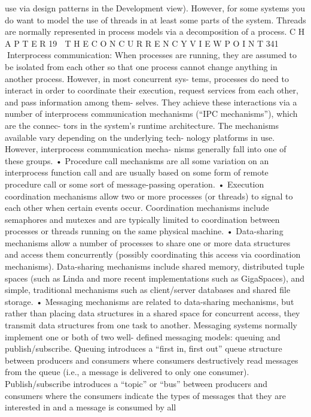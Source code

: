 use via design patterns in the Development view). However, for some
systems you do want to model the use of threads in at least some parts of
the system. Threads are normally represented in process models via a
decomposition of a process.
C H A P T E R 19  T H E C O N C U R R E N C Y V I E W P O I N T
 341
Interprocess communication: When processes are running, they are
assumed to be isolated from each other so that one process cannot
change anything in another process. However, in most concurrent sys-
tems, processes do need to interact in order to coordinate their execution,
request services from each other, and pass information among them-
selves. They achieve these interactions via a number of interprocess
communication mechanisms (“IPC mechanisms”), which are the connec-
tors in the system’s runtime architecture.
The mechanisms available vary depending on the underlying tech-
nology platforms in use. However, interprocess communication mecha-
nisms generally fall into one of these groups.
• Procedure call mechanisms are all some variation on an interprocess
function call and are usually based on some form of remote procedure
call or some sort of message-passing operation.
• Execution coordination mechanisms allow two or more processes (or
threads) to signal to each other when certain events occur.
Coordination mechanisms include semaphores and mutexes and are
typically limited to coordination between processes or threads running
on the same physical machine.
• Data-sharing mechanisms allow a number of processes to share one or
more data structures and access them concurrently (possibly
coordinating this access via coordination mechanisms). Data-sharing
mechanisms include shared memory, distributed tuple spaces (such as
Linda and more recent implementations such as GigaSpaces), and
simple, traditional mechanisms such as client/server databases and
shared file storage.
• Messaging mechanisms are related to data-sharing mechanisms, but
rather than placing data structures in a shared space for concurrent
access, they transmit data structures from one task to another.
Messaging systems normally implement one or both of two well-
defined messaging models: queuing and publish/subscribe. Queuing
introduces a “first in, first out” queue structure between producers
and consumers where consumers destructively read messages from
the queue (i.e., a message is delivered to only one consumer).
Publish/subscribe introduces a “topic” or “bus” between producers
and consumers where the consumers indicate the types of messages
that they are interested in and a message is consumed by all
